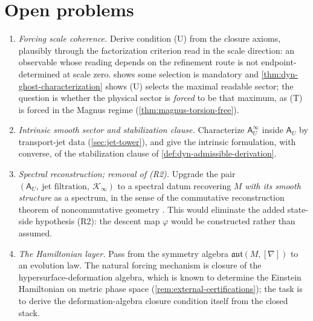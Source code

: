 \section{Open problems}
\label{sec:dyn-open}
\begin{enumerate}[label=\textup{(O\arabic*)}]
	\item
	      \emph{Forcing scale coherence.} Derive condition \textup{(U)}
	      from the closure axioms, plausibly through the factorization
	      criterion read in the scale direction: an observable whose
	      reading depends on the refinement route is not
	      endpoint-determined at scale zero.
	       shows some selection is
	      mandatory and \cref{thm:dyn-ghost-characterization} shows
	      \textup{(U)} selects the maximal readable sector; the question
	      is whether the physical sector is \emph{forced} to be that
	      maximum, as \textup{(T)} is forced in the Magnus regime
	      (\cref{thm:magnus-torsion-free}).
	\item
	      \emph{Intrinsic smooth sector and stabilization clause.}
	      Characterize \(\mathsf A_U^\infty\) inside \(\mathsf A_U\) by
	      transport-jet data (\cref{sec:jet-tower}), and give the
	      intrinsic formulation, with converse, of the stabilization
	      clause of \cref{def:dyn-admissible-derivation}.
	\item
	      \emph{Spectral reconstruction; removal of \textup{(R2)}.}
	      Upgrade the pair
	      \((\mathsf A_U,\ \text{jet filtration},\ \mathcal K_\infty)\)
	      to a spectral datum recovering \(M\) \emph{with its smooth
	      structure} as a spectrum, in the sense of the commutative
	      reconstruction theorem of noncommutative geometry
	      \cite{Connes2013}. This would
	      eliminate the added state-side hypothesis \textup{(R2)}: the
	      descent map \(\varphi\) would be constructed rather than
	      assumed.
	\item
	      \emph{The Hamiltonian layer.} Pass from the symmetry algebra
	      \(\mathfrak{aut}(M,[\nabla])\) to an evolution law. The
	      natural forcing mechanism is closure of the
	      hypersurface-deformation algebra, which is known to determine
	      the Einstein Hamiltonian on metric phase space
	      (\cref{rem:external-certifications}); the task is to derive
	      the deformation-algebra closure condition itself from the
	      closed stack.
\end{enumerate}

